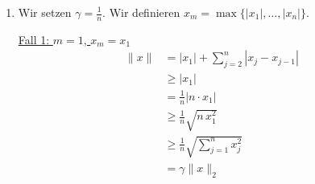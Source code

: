 \documentclass[a4paper,12pt]{article}
\begin{document}
\begin{enumerate}[label=\alph*)]
\begin{enumerate}[label=(\roman*)]
        \glqq$\Leftarrow$\grqq-Richtung:

        Sei $x = 0$. Daraus folgt direkt
        \[
            \|x\| = |x_1| + \sum_{j=2}^{n} |x_j - x_{j-1}| = 0.
        \]

        \item
        $\forall x \in \mathbb{R}^n\; \forall a \in \mathbb{R} : \|ax\| = |a|\,\|x\|$
        \begin{align*}
            \|ax\| &= |ax_1| + \sum_{j=2}^{n} |ax_j - ax_{j-1}| \\
                   &= |a|\,|x_1| + \sum_{j=2}^{n} |a|\,|x_j - x_{j-1}| \\
                   &= |a|\left(|x_1| + \sum_{j=2}^{n} |x_j - x_{j-1}|\right) \\
                   &= |a|\,\|x\|
        \end{align*}

        \item
        $\forall x, y \in \mathbb{R}^n : \|x + y\| \leq \|x\| + \|y\|$
        \begin{align*}
            \|x + y\| &= |x_1 + y_1| + \sum_{j=2}^{n} \bigl|(x_j + y_j) - (x_{j-1} + y_{j-1})\bigr| \\
                      &= |x_1 + y_1| + \sum_{j=2}^{n} \bigl|(x_j - x_{j-1}) + (y_j - y_{j-1})\bigr| \\
                      &\leq |x_1| + \sum_{j=2}^{n} |x_j - x_{j-1}| + |y_1| + \sum_{j=2}^{n} |y_j - y_{j-1}| \\
                      &= \|x\| + \|y\|
        \end{align*}

    \end{enumerate}

    \item
    Wir setzen $\gamma = \frac{1}{n}$.
    Wir definieren $x_m = \max\{|x_1|, \ldots, |x_n|\}$.

    \underline{Fall 1: $m = 1$, $x_m = x_1$}
    \begin{align*}
        \|x\| &= |x_1| + \sum_{j=2}^{n} |x_j - x_{j-1}| \\
              &\geq |x_1| \\
              &= \frac{1}{n} |n \cdot x_1| \\
              &\geq \frac{1}{n} \sqrt{n \, x_1^2} \\
              &\geq \frac{1}{n} \sqrt{\sum_{j=1}^{n} x_j^2} \\
              &= \gamma \|x\|_2
    \end{align*}


\end{enumerate}
\end{document}
